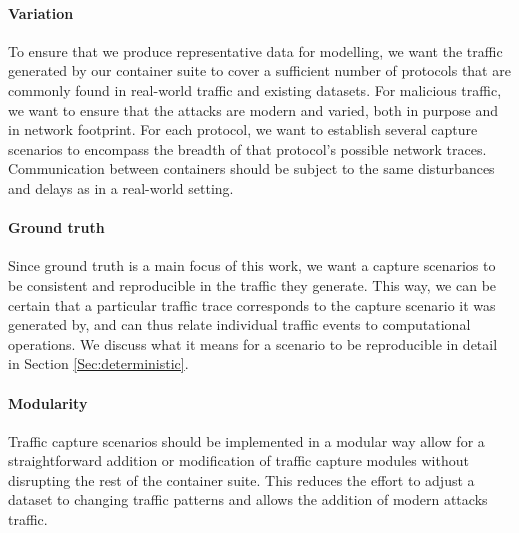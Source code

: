 \documentclass[sigconf]{acmart}
\begin{document}
 \paragraph{Variation} To ensure that we produce representative data for modelling, we want the traffic generated by our container suite to cover a sufficient number of protocols that are commonly found in real-world traffic and existing datasets. For malicious traffic, we want to ensure that the attacks are modern and varied, both in purpose and in network footprint. For each protocol, we want to establish several capture scenarios to encompass the breadth of that protocol's possible network traces. Communication between containers should be subject to the same disturbances and delays as in a real-world setting.

 
 
\paragraph{Ground truth} Since ground truth is a main focus of this work, we want a capture scenarios to be consistent and reproducible in the traffic they generate. This way, we can be certain that a particular traffic trace corresponds to the capture scenario it was generated by, and can thus relate individual traffic events to computational operations. We discuss what it means for a scenario to be reproducible in detail in Section \ref{Sec:deterministic}. 

\paragraph{Modularity} Traffic capture scenarios should be implemented in a modular way allow for a straightforward addition or modification of traffic capture modules without disrupting the rest of the container suite. This reduces the effort to adjust a dataset to changing traffic patterns and allows the addition of modern attacks traffic.
\end{document}
